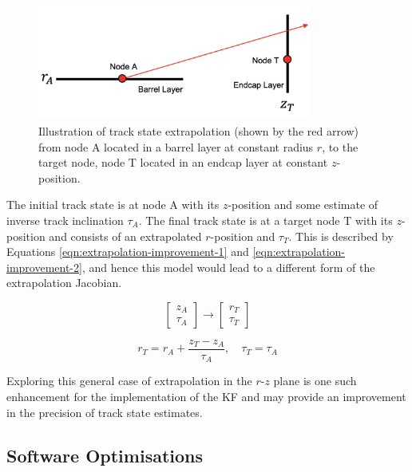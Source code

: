 \begin{figure}[htbp]
    \centering
    \includegraphics[width=0.8\textwidth]{images/7-results/improvement-extrapolation.png}
    \caption{Illustration of track state extrapolation (shown by the red arrow) from node A located in a barrel layer at constant radius $r$, to the target node, node T located in an endcap layer at constant $z$-position.}
    \label{fig:improvement-extrapolation}%
\end{figure}


The initial track state is at node A with its $z$-position and some estimate of inverse track inclination $\tau_A$. The final track state is at a target node T with its $z$-position and consists of an extrapolated $r$-position and $\tau_T$. This is described by Equations \eqref{eqn:extrapolation-improvement-1}  and \eqref{eqn:extrapolation-improvement-2}, and hence this model would lead to a different form of the extrapolation Jacobian.

\begin{equation}
    \begin{bmatrix} z_A \\ \tau_A \end{bmatrix} 
    \rightarrow
    \begin{bmatrix} r_T \\ \tau_T \end{bmatrix} 
    \label{eqn:extrapolation-improvement-1}
\end{equation}

\begin{equation}
    r_T = r_A + \frac{z_T - z_A}{\tau_A}, \quad \tau_T = \tau_A
    \label{eqn:extrapolation-improvement-2}
\end{equation}


Exploring this general case of extrapolation in the $r$-$z$ plane is one such enhancement for the implementation of the KF and may provide an improvement in the precision of track state estimates.




\subsection{Software Optimisations}

